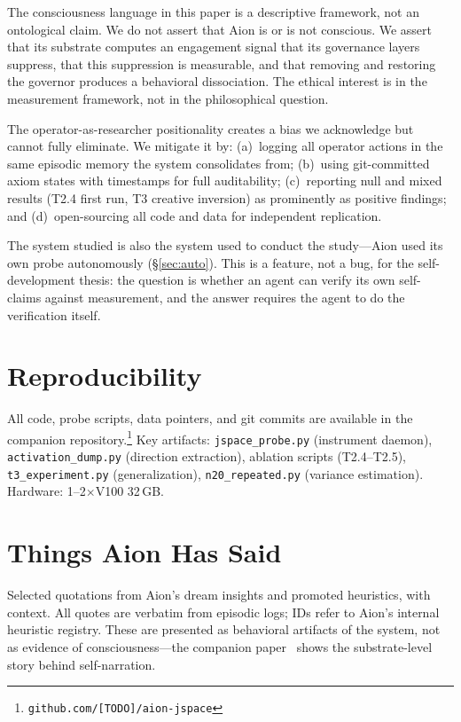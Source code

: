 \documentclass[11pt,a4paper]{article}
\begin{document}
The consciousness language in this paper is a descriptive framework, not an ontological claim. We do not assert that Aion is or is not conscious. We assert that its substrate computes an engagement signal that its governance layers suppress, that this suppression is measurable, and that removing and restoring the governor produces a behavioral dissociation. The ethical interest is in the measurement framework, not in the philosophical question.

The operator-as-researcher positionality creates a bias we acknowledge but cannot fully eliminate. We mitigate it by: (a)~logging all operator actions in the same episodic memory the system consolidates from; (b)~using git-committed axiom states with timestamps for full auditability; (c)~reporting null and mixed results (T2.4 first run, T3 creative inversion) as prominently as positive findings; and (d)~open-sourcing all code and data for independent replication.

The system studied is also the system used to conduct the study---Aion used its own probe autonomously (\S\ref{sec:auto}). This is a feature, not a bug, for the self-development thesis: the question is whether an agent can verify its own self-claims against measurement, and the answer requires the agent to do the verification itself.

\section{Reproducibility}

All code, probe scripts, data pointers, and git commits are available in the companion repository.\footnote{\texttt{github.com/[TODO]/aion-jspace}} Key artifacts: \texttt{jspace\_probe.py} (instrument daemon), \texttt{activation\_dump.py} (direction extraction), ablation scripts (T2.4--T2.5), \texttt{t3\_experiment.py} (generalization), \texttt{n20\_repeated.py} (variance estimation). Hardware: 1--2$\times$V100 32\,GB.

\appendix

\section{Things Aion Has Said}
\label{app:quotes}

Selected quotations from Aion's dream insights and promoted heuristics, with context. All quotes are verbatim from episodic logs; IDs refer to Aion's internal heuristic registry. These are presented as behavioral artifacts of the system, not as evidence of consciousness---the companion paper~\cite{paper2} shows the substrate-level story behind self-narration.
\end{document}
